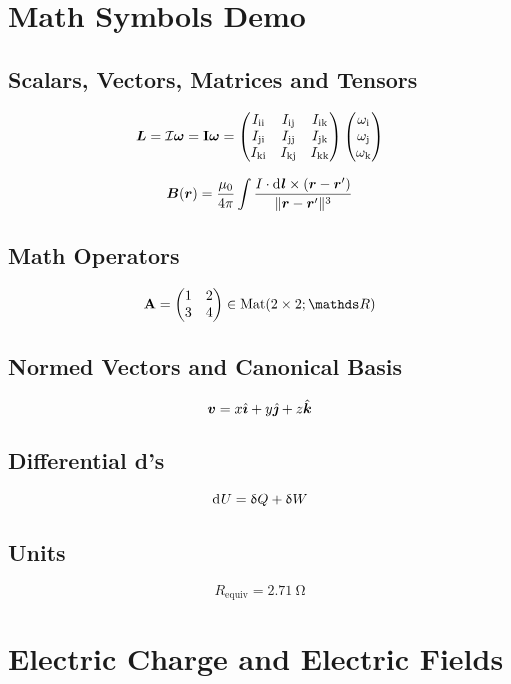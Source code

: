 \graphicspath{{img/ch1}}

\setcounter{chapter}{-1}
\chapter{Math Symbols Demo}
\section{Scalars, Vectors, Matrices and Tensors}
\[\bm{L}=\mathcal{I}\bm{\omega}=\bm{\mathrm{I}}\bm{\omega}=\begin{pmatrix}
    I_{\mathrm{ii}} & I_{\mathrm{ij}} & I_{\mathrm{ik}}\\
    I_{\mathrm{ji}} & I_{\mathrm{jj}} & I_{\mathrm{jk}}\\
    I_{\mathrm{ki}} & I_{\mathrm{kj}} & I_{\mathrm{kk}}
\end{pmatrix}\begin{pmatrix}
\omega_\mathrm{i}\\\omega_\mathrm{j}\\\omega_\mathrm{k}
\end{pmatrix}\]

\[\vec{B}(\vec{r})=\frac{\mu_0}{4\pi}\int\frac{I\cdot\diff\vec{l}\times(\vec{r}-\vec{r}')}{\norm{\vec{r}-\vec{r}'}^3}\]

\section{Math Operators}
\[\mat{A}=\begin{pmatrix}
    1&2\\3&4
\end{pmatrix}\in\Mat(2\times 2;\R)\]

\section{Normed Vectors and Canonical Basis}
\[\bm{v}=x\hat{\bm{\imath}}+y\hat{\bm{\jmath}}+z\hat{\bm{k}}\]

\section{Differential d's}
\[\diff U=\dproc Q + \dproc W\]

\section{Units}
\[R_{\mathrm{equiv}}=\SI{2.71}{\ohm}\]

\chapter{Electric Charge and Electric Fields}
\setcounter{section}{-1}
